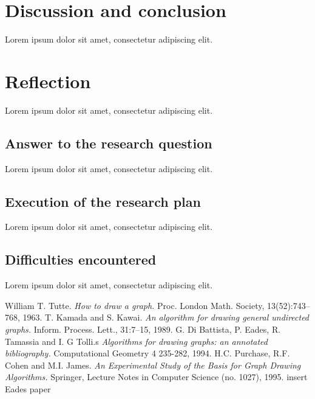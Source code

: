 \documentclass[a4paper,12pt,twoside]{article}
\begin{document}
\section{Discussion and conclusion}
Lorem ipsum dolor sit amet, consectetur adipiscing elit.

\section{Reflection}
Lorem ipsum dolor sit amet, consectetur adipiscing elit.
\subsection{Answer to the research question}
Lorem ipsum dolor sit amet, consectetur adipiscing elit.
\subsection{Execution of the research plan}
Lorem ipsum dolor sit amet, consectetur adipiscing elit.\subsection{Difficulties encountered}
Lorem ipsum dolor sit amet, consectetur adipiscing elit.

\begin{thebibliography}{99}
William T. Tutte. \emph{How to draw a graph.} Proc. London Math. Society, 13(52):743–768, 1963.
T. Kamada and S. Kawai. \emph{An algorithm for drawing general undirected graphs.} Inform. Process. Lett., 31:7–15, 1989.
G. Di Battista, P. Eades, R. Tamassia and I. G Tolli.s \emph{Algorithms for drawing graphs: an annotated bibliography.} Computational Geometry 4 235-282, 1994.
H.C. Purchase, R.F. Cohen and M.I. James. \emph{An Experimental Study of the Basis for Graph Drawing Algorithms.} Springer, Lecture Notes in Computer Science (no. 1027), 1995.
 insert Eades paper
\end{thebibliography}
\end{document}
